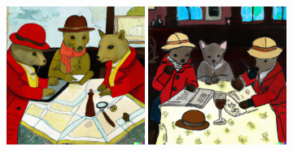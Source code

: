 \documentclass{article}
\newcommand{\imagewidthfactor}{0.4}
\begin{document}
\begin{figure}[h!]
\vspace{1.1em}
\includegraphics[width=\imagewidthfactor\textwidth]{media/4c.png}
\quad
\includegraphics[width=\imagewidthfactor\textwidth]{media/4d.png}
\end{figure}
\end{document}
